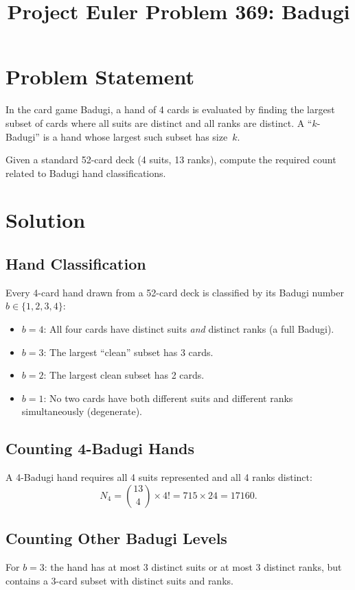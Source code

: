 \documentclass[12pt]{article}
\title{Project Euler Problem 369: Badugi}
\author{}
\date{}
\begin{document}
\maketitle

\section{Problem Statement}
In the card game Badugi, a hand of 4 cards is evaluated by finding the largest subset of cards where all suits are distinct and all ranks are distinct. A ``$k$-Badugi'' is a hand whose largest such subset has size~$k$.

Given a standard 52-card deck (4 suits, 13 ranks), compute the required count related to Badugi hand classifications.

\section{Solution}

\subsection{Hand Classification}
Every 4-card hand drawn from a 52-card deck is classified by its Badugi number $b \in \{1, 2, 3, 4\}$:
\begin{itemize}
\item $b = 4$: All four cards have distinct suits \emph{and} distinct ranks (a full Badugi).
\item $b = 3$: The largest ``clean'' subset has 3 cards.
\item $b = 2$: The largest clean subset has 2 cards.
\item $b = 1$: No two cards have both different suits and different ranks simultaneously (degenerate).
\end{itemize}

\subsection{Counting 4-Badugi Hands}
A 4-Badugi hand requires all 4 suits represented and all 4 ranks distinct:
\[
N_4 = \binom{13}{4} \times 4! = 715 \times 24 = 17160.
\]

\subsection{Counting Other Badugi Levels}
For $b = 3$: the hand has at most 3 distinct suits or at most 3 distinct ranks, but contains a 3-card subset with distinct suits and ranks.
\end{document}
